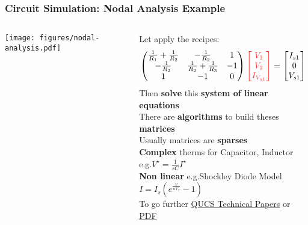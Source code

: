\begin{frame}
  \frametitle{Circuit Simulation: Nodal Analysis Example}
  \begin{columns}
    \begin{column}{.3\textwidth}
      \begin{center}
        \texttt{[image: figures/nodal-analysis.pdf]}
      \end{center}
    \end{column}
    \begin{column}{.7\textwidth}
      Let apply the recipes: %
      $$
      \begin{pmatrix}
        \frac{1}{R_1}+\frac{1}{R_2} & -\frac{1}{R_2} & 1 \\
        -\frac{1}{R_2} & \frac{1}{R_2}+\frac{1}{R_3} & -1 \\
        1 & -1 & 0
      \end{pmatrix}
      { \color{red!80}
      \begin{bmatrix}
        V_1 \\
        V_2 \\
        I_{V_{s1}}
      \end{bmatrix}
      }
      =
      \begin{bmatrix}
        I_{s1} \\
        0 \\
        V_{s1}
      \end{bmatrix}
      $$
      Then \textbf{solve} this \textbf{system of linear equations} \\[1em]
      There are \textbf{algorithms} to build theses \textbf{matrices} \\
      Usually matrices are \textbf{sparses} \\[1em]
      \textbf{Complex} therms for Capacitor, Inductor e.g.\@ $V^\star = \frac{1}{sC} I^\star$ %
      \\[.5em]
      \textbf{Non linear} e.g.\@ Shockley Diode Model $I = I_s \left( e^{\frac{V}{n V_T}} - 1 \right)$
      \\[1em]
      {\tiny
        To go further \href{http://qucs.sourceforge.net/tech/technical.html}{QUCS Technical Papers}
        or \href{http://qucs.sourceforge.net/docs/technical/technical.pdf}{PDF}
      }
    \end{column}
  \end{columns}
\end{frame}

